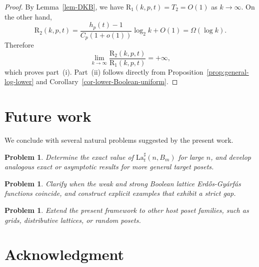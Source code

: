 \documentclass[twoside,12pt]{article}
\newtheorem{problem}[theorem]{Problem}
\newcommand{\LaT}{\mathrm{La}}
\begin{document}
\begin{proof}
By Lemma~\ref{lem-DKB}, we have $\mathrm{R}_{1}(k,p,t)=T_2=O(1)$ as $k\to\infty$. On the other hand,
\[
\mathrm{R}_{2}(k,p,t)
=
\frac{h_p(t)-1}{C_p(1+o(1))}\log_2 k+O(1)
=
\Omega(\log k).
\]
Therefore
\[
\lim_{k\to\infty}\frac{\mathrm{R}_{2}(k,p,t)}{\mathrm{R}_{1}(k,p,t)}=+\infty,
\]
which proves part~(i). Part~(ii) follows directly from Proposition~\ref{prop:general-log-lower} and Corollary~\ref{cor-lower-Boolean-uniform}.
\end{proof}

\section{Future work}\label{sec7}

We conclude with several natural problems suggested by the present work.

\begin{problem}
Determine the exact value of $\LaT_t^\sharp(n,B_m)$ for large $n$, and develop analogous exact or asymptotic results for more general target posets.
\end{problem}

\begin{problem}
Clarify when the weak and strong Boolean lattice Erd\H{o}s-Gy\'{a}rf\'{a}s functions coincide, and construct explicit examples that exhibit a strict gap.
\end{problem}

\begin{problem}
Extend the present framework to other host poset families, such as grids, distributive lattices, or random posets.
\end{problem}

\section*{Acknowledgment}
\end{document}
